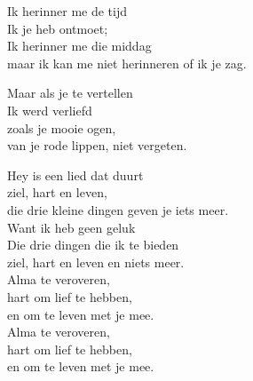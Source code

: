\clearpage
\begin{translation}
Ik herinner me de tijd\\
Ik je heb ontmoet;\\
Ik herinner me die middag\\
maar ik kan me niet herinneren of ik je zag.\vspace{\wlskip}

Maar als je te vertellen\\
Ik werd verliefd\\
zoals je mooie ogen,\\
van je rode lippen, niet vergeten.\vspace{\wlskip}

Hey is een lied dat duurt\\
ziel, hart en leven,\\
die drie kleine dingen geven je iets meer.\\
Want ik heb geen geluk\\
Die drie dingen die ik te bieden\\
ziel, hart en leven en niets meer.\\
Alma te veroveren,\\
hart om lief te hebben,\\
en om te leven met je mee.\\
Alma te veroveren,\\
hart om lief te hebben,\\
en om te leven met je mee.
\end{translation}
